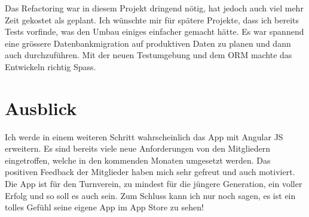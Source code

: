 Das Refactoring war in diesem Projekt dringend nötig, hat jedoch auch viel mehr Zeit gekostet als geplant. Ich wünschte mir für spätere Projekte, dass ich bereits Tests vorfinde, was den Umbau einiges einfacher gemacht hätte. Es war spannend eine grössere Datenbankmigration auf produktiven Daten zu planen und dann auch durchzuführen. Mit der neuen Testumgebung und dem ORM machte das Entwickeln richtig Spass.\\

\section{Ausblick}\label{fazit_ausblick}
Ich werde in einem weiteren Schritt wahrscheinlich das App mit Angular JS erweitern. Es sind bereits viele neue Anforderungen von den Mitgliedern eingetroffen, welche in den kommenden Monaten umgesetzt werden. Das positiven Feedback der Mitglieder haben mich sehr gefreut und auch motiviert. Die App ist für den Turnverein, zu mindest für die jüngere Generation, ein voller Erfolg und so soll es auch sein. Zum Schluss kann ich nur noch sagen, es ist ein tolles Gefühl seine eigene App im App Store zu sehen!
